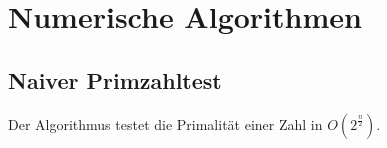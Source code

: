 \section{Numerische Algorithmen}

\subsection{Naiver Primzahltest}
Der Algorithmus testet die Primalität einer Zahl in $O(2^{\frac{n}{2}})$.
